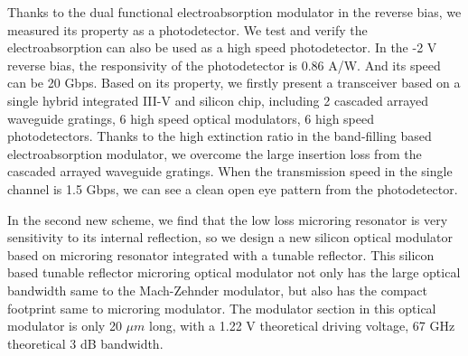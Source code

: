 \begin{englishabstract}
Thanks to the dual functional  electroabsorption modulator in the reverse bias, we measured its property as a photodetector. We test and verify the electroabsorption can also be used as a high speed photodetector. In the -2 V reverse bias, the responsivity of the photodetector is 0.86 A/W. And its speed can be 20 Gbps. Based on its property, we firstly present a transceiver based on a single hybrid integrated III-V and silicon chip, including 2 cascaded arrayed waveguide gratings, 6 high speed optical modulators, 6 high speed photodetectors. Thanks to the high extinction ratio in the band-filling based electroabsorption modulator, we overcome the large insertion loss from the cascaded arrayed waveguide gratings. When the transmission speed in the single channel is 1.5 Gbps, we can see a clean open eye pattern from the photodetector.

In the second new scheme, we find that the low loss microring resonator is very sensitivity to its internal reflection, so we design a new silicon optical modulator based on microring resonator integrated with a tunable reflector. This silicon based tunable reflector microring optical modulator not only has the large optical bandwidth same to the Mach-Zehnder modulator, but also has the compact footprint same to microring modulator. The modulator section in this optical modulator is only 20 $\mu m$ long, with a 1.22 V theoretical driving voltage, 67 GHz theoretical 3 dB bandwidth.

\thispagestyle{plain}

\end{englishabstract}
